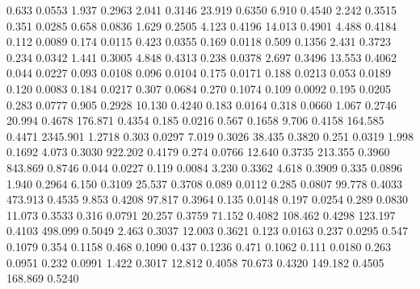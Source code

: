 0.633    0.0553 %
1.937    0.2963 %
2.041    0.3146 %
23.919   0.6350 %
6.910    0.4540 %
2.242    0.3515 %
0.351    0.0285 %
0.658    0.0836 %
1.629    0.2505 %
4.123    0.4196 %
14.013   0.4901 %
4.488    0.4184 %
0.112    0.0089 %
0.174    0.0115 %
0.423    0.0355 %
0.169    0.0118 %
0.509    0.1356 %
2.431    0.3723 %
0.234    0.0342 %
1.441    0.3005 %
4.848    0.4313 %
0.238    0.0378 %
2.697    0.3496 %
13.553   0.4062 %
0.044    0.0227 %
0.093    0.0108 %
0.096    0.0104 %
0.175    0.0171 %
0.188    0.0213 %
0.053    0.0189 %
0.120    0.0083 %
0.184    0.0217 %
0.307    0.0684 %
0.270    0.1074 %
0.109    0.0092 %
0.195    0.0205 %
0.283    0.0777 %
0.905    0.2928 %
10.130   0.4240 %
0.183    0.0164 %
0.318    0.0660 %
1.067    0.2746 %
20.994   0.4678 %
176.871  0.4354 %
0.185    0.0216 %
0.567    0.1658 %
9.706    0.4158 %
164.585  0.4471 %
2345.901 1.2718 %
0.303    0.0297 %
7.019    0.3026 %
38.435   0.3820 %
0.251    0.0319 %
1.998    0.1692 %
4.073    0.3030 %
922.202  0.4179 %
0.274    0.0766 %
12.640   0.3735 %
213.355  0.3960 %
843.869  0.8746 %
0.044    0.0227 %
0.119    0.0084 %
3.230    0.3362 %
4.618    0.3909 %
0.335    0.0896 %
1.940    0.2964 %
6.150    0.3109 %
25.537   0.3708 %
0.089    0.0112 %
0.285    0.0807 %
99.778   0.4033 %
473.913  0.4535 %
9.853    0.4208 %
97.817   0.3964 %
0.135    0.0148 %
0.197    0.0254 %
0.289    0.0830 %
11.073   0.3533 %
0.316    0.0791 %
20.257   0.3759 %
71.152   0.4082 %
108.462  0.4298 %
123.197  0.4103 %
498.099  0.5049 %
2.463    0.3037 %
12.003   0.3621 %
0.123    0.0163 %
0.237    0.0295 %
0.547    0.1079 %
0.354    0.1158 %
0.468    0.1090 %
0.437    0.1236 %
0.471    0.1062 %
0.111    0.0180 %
0.263    0.0951 %
0.232    0.0991 %
1.422    0.3017 %
12.812   0.4058 %
70.673   0.4320 %
149.182  0.4505 %
168.869  0.5240 %
